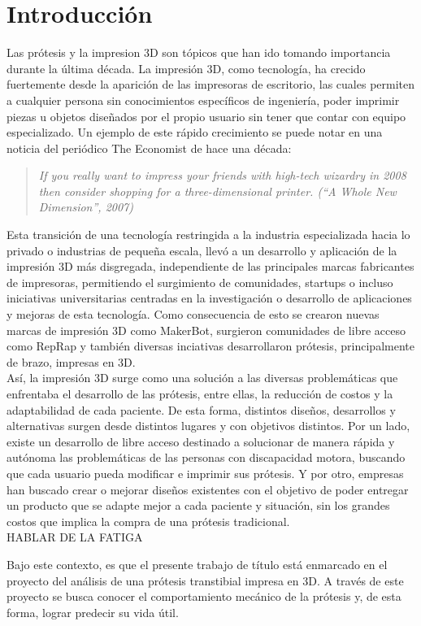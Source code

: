 \chapter{Introducción}

Las prótesis y la impresion 3D son tópicos que han ido tomando importancia durante la última década. La impresión 3D, como tecnología, ha crecido fuertemente desde la aparición de las impresoras de escritorio, las cuales permiten a cualquier persona sin conocimientos específicos de ingeniería, poder imprimir piezas u objetos diseñados por el propio usuario sin tener que contar con equipo especializado. Un ejemplo de este rápido crecimiento se puede notar en una noticia del periódico The Economist de hace una década: 

\begin{quote}
\textit{If you really want to impress your friends with high-tech wizardry in 2008 then consider shopping for a three-dimensional printer. (``A Whole New Dimension'', 2007)}
\end{quote}


Esta transición de una tecnología restringida a la industria especializada hacia lo privado o industrias de pequeña escala, llevó a un desarrollo y aplicación de la impresión 3D más disgregada, independiente de las principales marcas fabricantes de impresoras, permitiendo el surgimiento de comunidades, startups o incluso iniciativas universitarias centradas en la investigación o desarrollo de aplicaciones y mejoras de esta tecnología. Como consecuencia de esto se crearon nuevas marcas de impresión 3D como MakerBot, surgieron comunidades de libre acceso como RepRap y también diversas inciativas desarrollaron prótesis, principalmente de brazo, impresas en 3D.\\

Así, la impresión 3D surge como una solución a las diversas problemáticas que enfrentaba el desarrollo de las prótesis, entre ellas, la reducción de costos y la adaptabilidad de cada paciente. De esta forma, distintos diseños, desarrollos y alternativas surgen desde distintos lugares y con objetivos distintos. Por un lado, existe un desarrollo de libre acceso destinado a solucionar de manera rápida y autónoma las problemáticas de las personas con discapacidad motora, buscando que cada usuario pueda modificar e imprimir sus prótesis. Y por otro, empresas han buscado crear o mejorar diseños existentes con el objetivo de poder entregar un producto que se adapte mejor a cada paciente y situación, sin los grandes costos que implica la compra de una prótesis tradicional.\\

HABLAR DE LA FATIGA

Bajo este contexto, es que el presente trabajo de título está enmarcado en el proyecto del análisis de una prótesis transtibial impresa en 3D. A través de este proyecto se busca conocer el comportamiento mecánico de la prótesis y, de esta forma, lograr predecir su vida útil.

